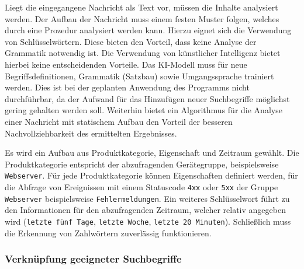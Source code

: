 Liegt die eingegangene Nachricht als Text vor, müssen die Inhalte analysiert werden. Der Aufbau der Nachricht muss einem festen Muster folgen, welches durch eine Prozedur analysiert werden kann. Hierzu eignet sich die Verwendung von Schlüsselwörtern. Diese bieten den Vorteil, dass keine Analyse der Grammatik notwendig ist. Die Verwendung von künstlicher Intelligenz bietet hierbei keine entscheidenden Vorteile. Das KI-Modell muss für neue Begriffsdefinitionen, Grammatik (Satzbau) sowie Umgangssprache trainiert werden. Dies ist bei der geplanten Anwendung des Programms nicht durchführbar, da der Aufwand für das Hinzufügen neuer Suchbegriffe möglichst gering gehalten werden soll. Weiterhin bietet ein Algorithmus für die Analyse einer Nachricht mit statischem Aufbau den Vorteil der besseren Nachvollziehbarkeit des ermittelten Ergebnisses.

Es wird ein Aufbau aus Produktkategorie, Eigenschaft und Zeitraum gewählt. Die Produktkategorie entspricht der abzufragenden Gerätegruppe, beispielsweise \lstinline{Webserver}. Für jede Produktkategorie können Eigenschaften definiert werden, für die Abfrage von Ereignissen mit einem Statuscode \lstinline{4xx} oder \lstinline{5xx} der Gruppe \lstinline{Webserver} beispielsweise \lstinline{Fehlermeldungen}. Ein weiteres Schlüsselwort führt zu den Informationen für den abzufragenden Zeitraum, welcher relativ angegeben wird (\lstinline{letzte fünf Tage}, \lstinline{letzte Woche}, \lstinline{letzte 20 Minuten}). Schließlich muss die Erkennung von Zahlwörtern zuverlässig funktionieren.

\subsubsection{Verknüpfung geeigneter Suchbegriffe}

